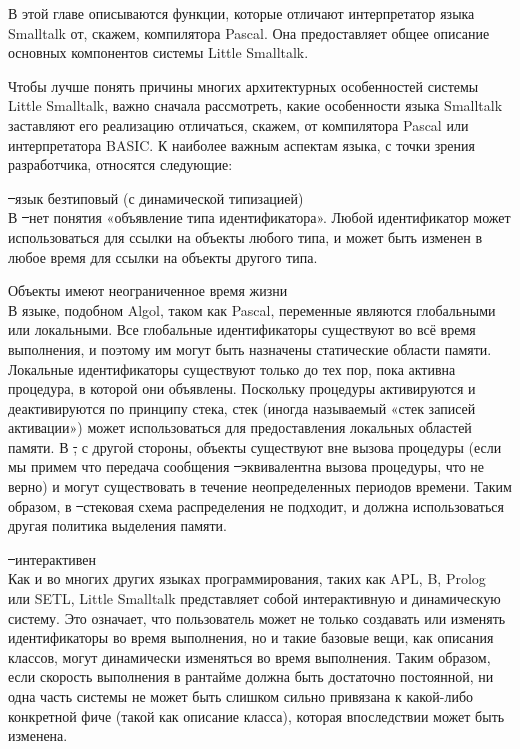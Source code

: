 \secdown

В этой главе описываются функции, которые отличают интерпретатор языка Smalltalk
от, скажем, компилятора Pascal. Она предоставляет общее описание основных
компонентов системы Little Smalltalk.

\bigskip

Чтобы лучше понять причины многих архитектурных особенностей системы Little
Smalltalk, важно сначала рассмотреть, какие особенности языка Smalltalk
заставляют его реализацию отличаться, скажем, от компилятора Pascal или
интерпретатора BASIC. К наиболее важным аспектам языка, с точки зрения
разработчика, относятся следующие:
\begin{description}

    \item{\st\ язык безтиповый (с динамической типизацией)}\ \\
    В \st\ нет понятия «объявление типа идентификатора». Любой
    идентификатор может использоваться для ссылки на объекты любого типа, и
    может быть изменен в любое время для ссылки на объекты другого типа.

    \item{Объекты имеют неограниченное время жизни}\ \\
    В языке, подобном Algol, таком как Pascal, переменные являются глобальными
    или локальными. Все глобальные идентификаторы существуют во всё время
    выполнения, и поэтому им могут быть назначены статические области памяти.
    Локальные идентификаторы существуют только до тех пор, пока активна
    процедура, в которой они объявлены. Поскольку процедуры активируются и
    деактивируются по принципу стека, стек (иногда называемый «стек записей
    активации») может использоваться для предоставления локальных областей
    памяти. В \st, с другой стороны, объекты существуют вне вызова
    процедуры (если мы примем что передача сообщения \st\ эквивалентна
    вызова процедуры, что не верно) и могут существовать в течение
    неопределенных периодов времени. Таким образом, в \st\ стековая схема
    распределения не подходит, и должна использоваться другая политика выделения
    памяти.

    \item{\st\ интерактивен}\ \\
    Как и во многих других языках программирования, таких как APL, B, Prolog или
    SETL, Little Smalltalk представляет собой интерактивную и динамическую
    систему. Это означает, что пользователь может не только создавать или
    изменять идентификаторы во время выполнения, но и такие базовые вещи, как
    описания классов, могут динамически изменяться во время выполнения. Таким
    образом, если скорость выполнения в рантайме должна быть достаточно
    постоянной, ни одна часть системы не может быть слишком сильно привязана к
    какой-либо конкретной фиче (такой как описание класса), которая впоследствии
    может быть изменена.


\end{description}
